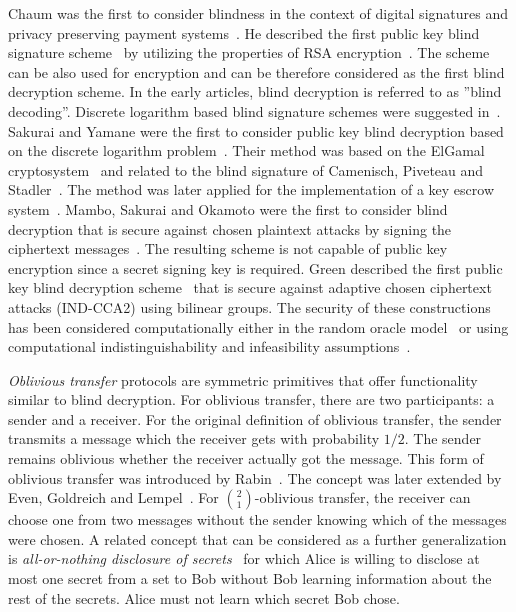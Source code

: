 \documentclass[10pt,journal]{IEEEtran}
\begin{document}
Chaum was the first to consider blindness in the context of digital signatures
and privacy preserving payment systems~\cite{Chaum_1983}. He described the
first public key blind signature scheme~\cite{Chaum_1985} by utilizing the properties of RSA encryption~\cite{Rivest_1978}.
The scheme can be also used for encryption and can be therefore considered as the first blind decryption scheme.
In the early articles, blind decryption is referred to as ''blind decoding''.
Discrete logarithm based blind signature schemes were suggested in~\cite{Chaum_1992,Okamoto_1992,Horster_1995,Camenisch_1995}.
Sakurai and Yamane were the first to consider public key
blind decryption based on the discrete logarithm problem~\cite{Sakurai_1996}.
Their method was based on the ElGamal cryptosystem~\cite{ElGamal_1985}
and related to the blind signature of Camenisch, Piveteau and Stadler~\cite{Camenisch_1995}. The method was later applied for
the implementation of a key escrow system~\cite{Sakurai_1998}.
Mambo, Sakurai and Okamoto were the first to consider blind decryption that is secure against chosen
plaintext attacks by signing the ciphertext messages~\cite{Mambo_1996}. The resulting scheme
is not capable of public key encryption since a secret signing key is required.
Green described the first public key blind decryption scheme~\cite{Green_2011} that is secure against
adaptive chosen ciphertext attacks (IND-CCA2) using bilinear groups.
The security of these constructions has been considered computationally
either in the random oracle model~\cite{Schnorr_2000} or using computational indistinguishability
and infeasibility assumptions~\cite{Green_2011}.

\emph{Oblivious transfer} protocols are symmetric primitives 
that offer functionality similar to blind decryption.
For oblivious transfer, there are two participants: a sender and
a receiver. For the original definition of oblivious transfer, the sender transmits a message which
the receiver gets with probability $1/2$. The sender remains oblivious whether the receiver actually
got the message. This form of oblivious transfer was introduced by Rabin~\cite{Rabin_1981}. The 
concept was later extended by Even, Goldreich and Lempel~\cite{Even_1985}.
For ${2 \choose 1}$-oblivious transfer, the receiver can choose one from two messages without the sender
knowing which of the messages were chosen.
A related concept that can be considered as a further generalization
is \emph{all-or-nothing disclosure of secrets}~\cite{Brassard_1987}
for which Alice is willing to disclose at most one secret from a set
to Bob without Bob learning information about the rest of the secrets. Alice must not learn which secret Bob chose.
\end{document}
